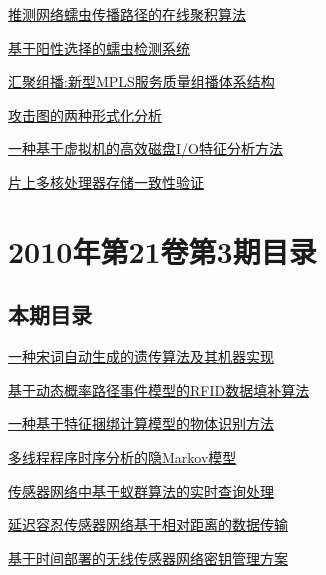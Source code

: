 \documentclass[a4paper]{article}
\begin{document}
\href{http://www.jos.org.cn/ch/reader/download_pdf.aspx?file_no=3514&year_id=2010&quarter_id=4&falg=1}{推测网络蠕虫传播路径的在线聚积算法}

\href{http://www.jos.org.cn/ch/reader/download_pdf.aspx?file_no=3515&year_id=2010&quarter_id=4&falg=1}{基于阳性选择的蠕虫检测系统}

\href{http://www.jos.org.cn/ch/reader/download_pdf.aspx?file_no=3516&year_id=2010&quarter_id=4&falg=1}{汇聚组播:新型MPLS服务质量组播体系结构}

\href{http://www.jos.org.cn/ch/reader/download_pdf.aspx?file_no=3584&year_id=2010&quarter_id=4&falg=1}{攻击图的两种形式化分析}

\href{http://www.jos.org.cn/ch/reader/download_pdf.aspx?file_no=3492&year_id=2010&quarter_id=4&falg=1}{一种基于虚拟机的高效磁盘I/O特征分析方法}

\href{http://www.jos.org.cn/ch/reader/download_pdf.aspx?file_no=3705&year_id=2010&quarter_id=4&falg=1}{片上多核处理器存储一致性验证}


\section{\textbf{2010年第21卷第3期目录}}
\subsection{本期目录}
\href{http://www.jos.org.cn/ch/reader/download_pdf.aspx?file_no=3596&year_id=2010&quarter_id=3&falg=1}{一种宋词自动生成的遗传算法及其机器实现}

\href{http://www.jos.org.cn/ch/reader/download_pdf.aspx?file_no=3454&year_id=2010&quarter_id=3&falg=1}{基于动态概率路径事件模型的RFID数据填补算法}

\href{http://www.jos.org.cn/ch/reader/download_pdf.aspx?file_no=3520&year_id=2010&quarter_id=3&falg=1}{一种基于特征捆绑计算模型的物体识别方法}

\href{http://www.jos.org.cn/ch/reader/download_pdf.aspx?file_no=3521&year_id=2010&quarter_id=3&falg=1}{多线程程序时序分析的隐Markov模型}

\href{http://www.jos.org.cn/ch/reader/download_pdf.aspx?file_no=3413&year_id=2010&quarter_id=3&falg=1}{传感器网络中基于蚁群算法的实时查询处理}

\href{http://www.jos.org.cn/ch/reader/download_pdf.aspx?file_no=3459&year_id=2010&quarter_id=3&falg=1}{延迟容忍传感器网络基于相对距离的数据传输}

\href{http://www.jos.org.cn/ch/reader/download_pdf.aspx?file_no=3457&year_id=2010&quarter_id=3&falg=1}{基于时间部署的无线传感器网络密钥管理方案}
\end{document}
